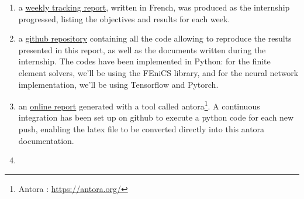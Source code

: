 \begin{enumerate}[label=\textbullet]
	\item a \href{https://github.com/flecourtier/phifem_stage/blob/main/docs/suivi/suivi.pdf}{weekly tracking report}, written in French, was produced as the internship progressed, listing the objectives and results for each week.
	\item a \href{https://github.com/flecourtier/phifem_stage}{github repository} containing all the code allowing to reproduce the results presented in this report, as well as the documents written during the internship. The codes have been implemented in Python: for the finite element solvers, we'll be using the FEniCS library, and for the neural network implementation, we'll be using Tensorflow and Pytorch. 
	\item an \href{https://flecourtier.github.io/phifem_stage/phifem_project/1.0.3/main_page.html}{online report} generated with a tool called antora\footnote{Antora : \url{https://antora.org/}}. A continuous integration has been set up on github to execute a python code for each new push, enabling the latex file to be converted directly into this antora documentation.
	\item {}
\end{enumerate}